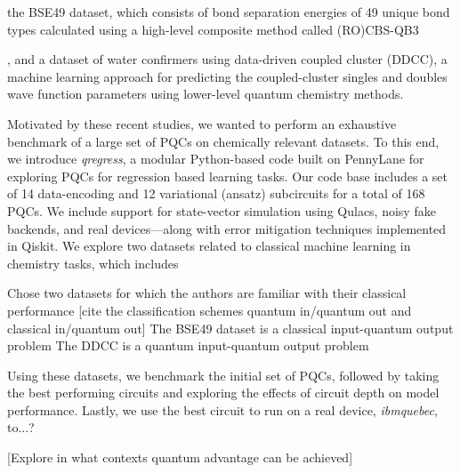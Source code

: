 \documentclass[journal=jacsat,manuscript=article]{achemso}
\begin{document}
the BSE49 dataset\cite{prasad_bse49_2021}, which consists of bond separation energies of 49 unique bond types calculated using a high-level composite method called (RO)CBS-QB3

, and a dataset of water confirmers using data-driven coupled cluster (DDCC)\cite{townsend_data-driven_2019}, a machine learning approach for predicting the coupled-cluster singles and doubles wave function parameters using lower-level quantum chemistry methods.



Motivated by these recent studies, we wanted to perform an exhaustive benchmark of a large set of PQCs on chemically relevant datasets.
To this end,  we introduce \textit{qregress}, a modular Python-based code built on PennyLane for exploring PQCs for regression based learning tasks.
Our code base includes a set of 14 data-encoding and 12 variational (ansatz) subcircuits for a total of 168 PQCs.
We include support for state-vector simulation using Qulacs, noisy fake backends, and real devices---along with error mitigation techniques implemented in Qiskit. 
We explore two datasets related to classical machine learning in chemistry tasks, which includes 


Chose two datasets for which the authors are familiar with their classical performance
[cite the classification schemes quantum in/quantum out and classical in/quantum out]
The BSE49 dataset is a classical input-quantum output problem
The DDCC is a quantum input-quantum output problem

Using these datasets, we benchmark the initial set of PQCs, followed by taking the best performing circuits and exploring the effects of circuit depth on model performance.
Lastly, we use the best circuit to run on a real device, \textit{ibm\textunderscore quebec}, to...?


[Explore in what contexts quantum advantage can be achieved]
\end{document}

